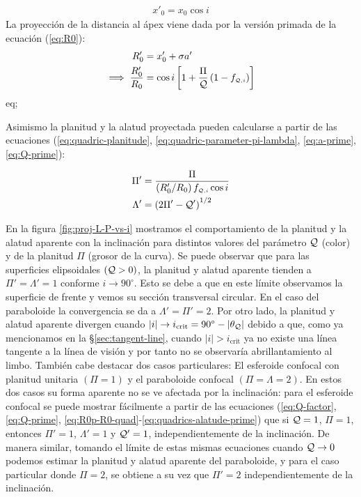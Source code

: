 \begin{align}
  x'_0 = x_0\cos i
\end{align}
La proyección de la distancia al ápex viene dada por la versión primada de la ecuación (\ref{eq:R0}):
\begin{align}
  R'_0 &=  x'_0 + \sigma a'\\
  \implies \frac{R'_0}{R_0} &= \cos i\left[1 + \frac{\Pi}{\mathcal{Q}}\left(1 - f_{\scriptscriptstyle \mathcal{Q}, i}\right)\right] \label{eq:R0p-R0-quad}
\end{align}eq;

Asimismo la planitud y la alatud proyectada pueden calcularse a partir de las ecuaciones (\ref{eq:quadric-planitude}, \ref{eq:quadric-parameter-pi-lambda}, \ref{eq:a-prime}, \ref{eq:Q-prime}):

\begin{align}
  \Pi' &= \frac{\Pi}{\left(R'_0/R_0\right)f_{\scriptscriptstyle \mathcal{Q}, i}\cos i} \label{eq:quadrics-planitude-prime}\\
  \Lambda' &= \left(2\Pi' - \mathcal{Q}'\right)^{1/2} \label{eq:quadrics-alatude-prime}
\end{align}

En la figura \ref{fig:proj-L-P-vs-i} mostramos el comportamiento de la planitud y la alatud aparente con la inclinación para distintos valores del parámetro $\mathcal{Q}$ (color) y de la planitud $\Pi$ (grosor de la curva). Se puede observar que para las superficies elipsoidales $(\mathcal{Q} > 0)$, la planitud y alatud aparente tienden a $\Pi' = \Lambda' = 1$ conforme $i \to 90^\circ$. Esto se debe a que en este límite observamos la superficie de frente y vemos su sección transversal circular. En el caso del paraboloide la convergencia se da a $\Lambda' = \Pi' = 2$. Por otro lado, la planitud y alatud aparente divergen cuando $|i| \to i_{\mathrm{crit}} = 90^\circ - |\theta_{\mathcal{Q}}|$ debido a que, como ya mencionamos en la \S \ref{sec:tangent-line}, cuando $|i| > i_{\mathrm{crit}}$ ya no existe una línea tangente a la línea de visión y por tanto no se observaría abrillantamiento al limbo. También cabe destacar dos casos particulares: El esferoide confocal con planitud unitaria $(\Pi = 1)$ y el paraboloide confocal $(\Pi = \Lambda = 2)$. En estos dos casos su forma aparente no se ve afectada por la inclinación: para el esferoide confocal se puede mostrar fácilmente a partir de las ecuaciones (\ref{eq:Q-factor}, \ref{eq:Q-prime}, \ref{eq:R0p-R0-quad}-\ref{eq:quadrics-alatude-prime}) que si $\mathcal{Q} = 1$, $\Pi = 1$, entonces $\Pi'=1$, $\Lambda'=1$ y $\mathcal{Q}' = 1$, independientemente de la inclinación. De manera similar, tomando el límite de estas mismas ecuaciones cuando $\mathcal{Q}\to 0$ podemos estimar la planitud y alatud aparente del paraboloide, y para el caso particular donde $\Pi = 2$, se obtiene a su vez que $\Pi'=2$ independientemente de la inclinación.

